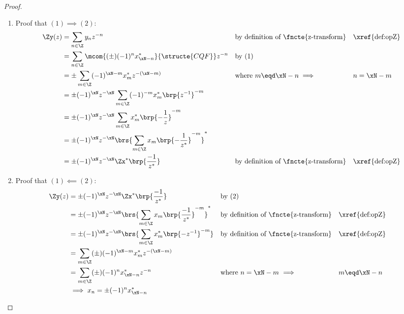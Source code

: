 \begin{proof}
\begin{enumerate}
  \item Proof that $(1)\implies(2)$:
    \begin{align*}
      \Zy(z)
        &= \sum_{n\in\Z}  y_{n}  z^{-n}
        && \text{by definition of \fncte{z-transform}}
        && \text{\xref{def:opZ}}
      \\&= \sum_{n\in\Z} \mcom{(\pm) (-1)^n x^\ast_{\xN-n}}{\structe{CQF}} z^{-n}
        && \text{by (1)}
      \\&= \pm\sum_{m\in\Z} (-1)^{\xN-m} x_m^\ast z^{-(\xN-m)}
        && \text{where $m\eqd\xN-n \implies$}
        && \text{$n=\xN-m$}
      \\&= \pm (-1)^\xN z^{-\xN}
           \sum_{m\in\Z}(-1)^{-m} x_m^\ast \brp{z^{-1}}^{-m}
      \\&= \pm (-1)^\xN z^{-\xN}
           \sum_{m\in\Z} x^\ast_m \brp{-\frac{1}{z}}^{-m}
      \\&= \pm (-1)^\xN z^{-\xN}
           \brs{\sum_{m\in\Z} x_m \brp{-\frac{1}{z^\ast}}^{-m}}^\ast
      \\&= \pm (-1)^\xN z^{-\xN}\Zx^\ast\brp{\frac{-1}{z^\ast}}
        && \text{by definition of \fncte{z-transform}}
        && \text{\xref{def:opZ}}
    \end{align*}

  \item Proof that $(1)\impliedby(2)$:
    \begin{align*}
      \Zy(z)
        &= \pm (-1)^\xN z^{-\xN} \Zx^\ast\brp{\frac{-1}{z^\ast}}
        && \text{by (2)}
      \\&= \pm (-1)^\xN z^{-\xN} \brs{\sum_{m\in\Z} x_m \brp{\frac{-1}{z^\ast}}^{-m}}^\ast
        && \text{by definition of \fncte{z-transform}}
        && \text{\xref{def:opZ}}
      \\&= \pm (-1)^\xN z^{-\xN} \brs{\sum_{m\in\Z} x^\ast_m \brp{-z^{-1}}^{-m}}
        && \text{by definition of \fncte{z-transform}}
        && \text{\xref{def:opZ}}
      \\&= \sum_{m\in\Z}(\pm) (-1)^{\xN-m} x^\ast_m z^{-(\xN-m)}
      \\&= \sum_{m\in\Z}(\pm) (-1)^{n} x^\ast_{\xN-n} z^{-n}
        && \text{where $n=\xN-m$ $\implies$}
        && \text{$m\eqd\xN-n$}
      \\&\implies x_n = \pm (-1)^n x^\ast_{\xN-n}
    \end{align*}


\end{enumerate}
\end{proof}
